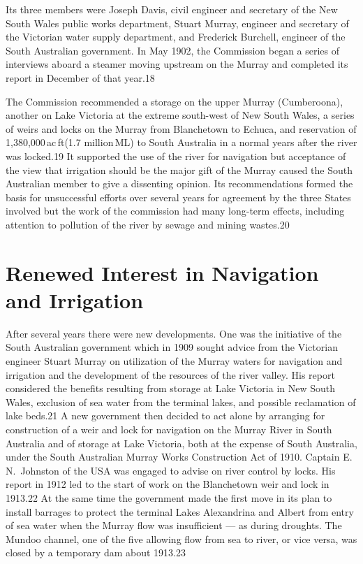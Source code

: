 Its three members were Joseph Davis, civil engineer and secretary of
the New South Wales public works department, Stuart Murray, engineer
and secretary of the Victorian water supply department, and Frederick
Burchell, engineer of the South Australian government.  In May 1902,
the Commission began a series of interviews aboard a steamer moving
upstream on the Murray and completed its report in December of that
year.18

The Commission recommended a storage on the upper Murray (Cumberoona),
another on Lake Victoria at the extreme south-west of New South Wales,
a series of weirs and locks on the Murray from Blanchetown to Echuca,
and reservation of 1,380,000\,ac\,ft(1.7 million\,ML) to South
Australia in a normal years after the river was locked.19 It supported
the use of the river for navigation but acceptance of the view that
irrigation should be the major gift of the Murray caused the South
Australian member to give a dissenting opinion.  Its recommendations
formed the basis for unsuccessful efforts over several years for
agreement by the three States involved but the work of the commission
had many long-term effects, including attention to pollution of the
river by sewage and mining wastes.20

\section{Renewed Interest in Navigation and Irrigation}

After several years there were new developments. One was the
initiative of the South Australian government which in 1909 sought
advice from the Victorian engineer Stuart Murray on utilization of the
Murray waters for navigation and irrigation and the development of the
resources of the river valley.  His report considered the benefits
resulting from storage at Lake Victoria in New South Wales, exclusion
of sea water from the terminal lakes, and possible reclamation of lake
beds.21 A new government then decided to act alone by arranging for
construction of a weir and lock for navigation on the Murray River in
South Australia and of storage at Lake Victoria, both at the expense
of South Australia, under the South Australian Murray Works
Construction Act of 1910.  Captain E.\,N.~Johnston of the USA was
engaged to advise on river control by locks.  His report in 1912 led
to the start of work on the Blanchetown weir and lock in 1913.22 At
the same time the government made the first move in its plan to
install barrages to protect the terminal Lakes Alexandrina and Albert
from entry of sea water when the Murray flow was insufficient --- as
during droughts.  The Mundoo channel, one of the five allowing flow
from sea to river, or vice versa, was closed by a temporary dam about
1913.23

